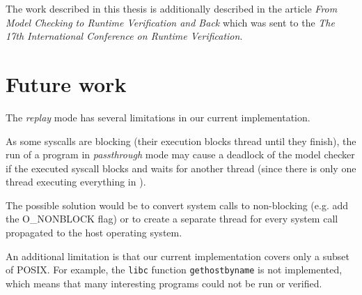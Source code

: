The work described in this thesis is additionally described in the article \textit{From Model Checking to Runtime Verification and Back} \cite{Divine6} which was sent to the \textit{The 17th International Conference on Runtime Verification}. \newpage

\section{Future work} \label{sec:conclusion:future}

The \textit{replay} mode has several limitations in our current implementation.

As some syscalls are blocking (their execution blocks thread until they finish), the run of a program in \textit{passthrough} mode may cause a deadlock of the model checker if the executed syscall blocks and waits for another thread (since there is only one thread executing everything in \divine).

The possible solution would be to convert system calls to non-blocking (e.g. add the O\_NONBLOCK flag) or to create a separate thread for every system call propagated to the host operating system.

An additional limitation is that our current implementation covers only a subset of POSIX. For example, the \texttt{libc} function \texttt{gethostbyname} is not implemented, which means that many interesting programs could not be run or verified.